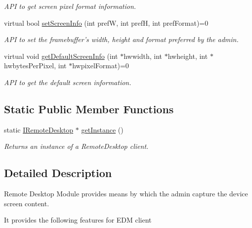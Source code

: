 \begin{DoxyCompactItemize}
\begin{DoxyCompactList}\small\item\em \-A\-P\-I to get screen pixel format information. \end{DoxyCompactList}\item 
virtual bool \hyperlink{classknoxremotedesktop_1_1IRemoteDesktop_aeb13652779ac87ce9de9a8155f6dc60b}{set\-Screen\-Info} (int pref\-W, int pref\-H, int pref\-Format)=0
\begin{DoxyCompactList}\small\item\em \-A\-P\-I to set the framebuffer's width, height and format preferred by the admin. \end{DoxyCompactList}\item 
virtual void \hyperlink{classknoxremotedesktop_1_1IRemoteDesktop_aafef444b0d8af3044e790932648cec3b}{get\-Default\-Screen\-Info} (int $\ast$hwwidth, int $\ast$hwheight, int $\ast$hwbytes\-Per\-Pixel, int $\ast$hwpixel\-Format)=0
\begin{DoxyCompactList}\small\item\em \-A\-P\-I to get the default screen information. \end{DoxyCompactList}\end{DoxyCompactItemize}
\subsection*{\-Static \-Public \-Member \-Functions}
\begin{DoxyCompactItemize}
\item 
static \hyperlink{classknoxremotedesktop_1_1IRemoteDesktop}{\-I\-Remote\-Desktop} $\ast$ \hyperlink{classknoxremotedesktop_1_1IRemoteDesktop_a86eefbec946d605470af069999763f74}{get\-Instance} ()
\begin{DoxyCompactList}\small\item\em \-Returns an instance of a \-Remote\-Desktop client. \end{DoxyCompactList}\end{DoxyCompactItemize}


\subsection{\-Detailed \-Description}
\-Remote \-Desktop \-Module provides means by which the admin capture the device screen content. 

\-It provides the following features for \-E\-D\-M client\par

